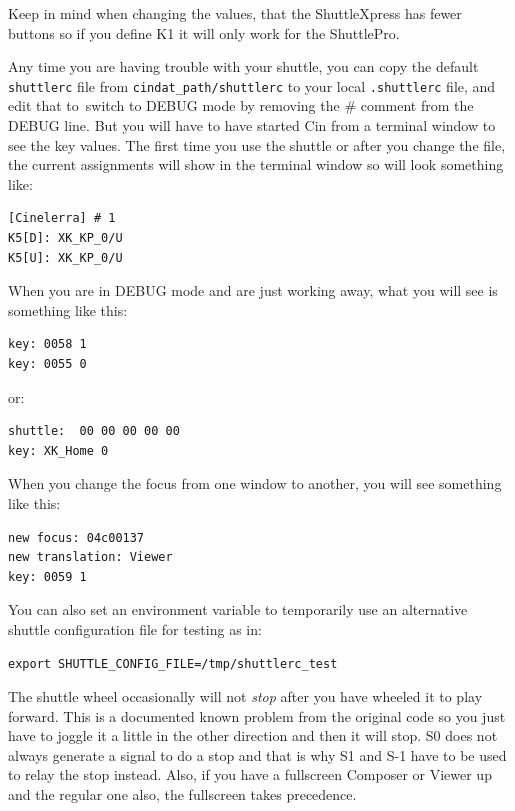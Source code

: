 Keep in mind when changing the values, that the ShuttleXpress has
fewer buttons so if you define K1 it will only work for the
ShuttlePro.

Any time you are having trouble with your shuttle, you can copy the
default \texttt{shuttlerc} file from
\texttt{{cindat\_path}/shuttlerc} to your local \texttt{.shuttlerc}
file, and edit that to\ switch to DEBUG mode by removing the \#
comment from the DEBUG line.  But you will have to have started Cin
from a terminal window to see the key values. The first time you use
the shuttle or after you change the file, the current assignments
will show in the terminal window so will look something like:

\begin{lstlisting}[style=sh]
[Cinelerra] # 1
K5[D]: XK_KP_0/U
K5[U]: XK_KP_0/U
\end{lstlisting}

When you are in DEBUG mode and are just working away, what you will
see is something like this:

\begin{lstlisting}[style=sh]
key: 0058 1
key: 0055 0
\end{lstlisting}

or:

\begin{lstlisting}[style=sh]
shuttle:  00 00 00 00 00
key: XK_Home 0
\end{lstlisting}

When you change the focus from one window to another, you will see
something like this:

\begin{lstlisting}[style=sh]
new focus: 04c00137
new translation: Viewer
key: 0059 1
\end{lstlisting}

You can also set an environment variable to temporarily use an
alternative shuttle configuration file for testing as in:

\begin{lstlisting}[style=sh]
export SHUTTLE_CONFIG_FILE=/tmp/shuttlerc_test
\end{lstlisting}

The shuttle wheel occasionally will not \textit{stop} after you have
wheeled it to play forward.  This is a documented known problem from
the original code so you just have to joggle it a little in the
other direction and then it will stop.  S0 does not always generate
a signal to do a stop and that is why S1 and S-1 have to be used to
relay the stop instead.  Also, if you have a fullscreen Composer or
Viewer up and the regular one also, the fullscreen takes precedence.


